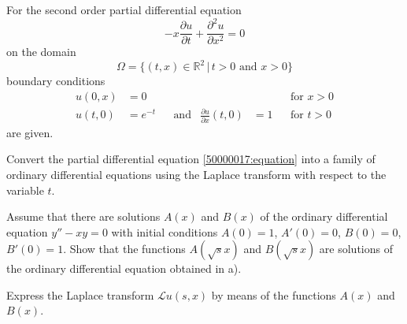 For the second order partial differential equation
\begin{equation}
-x\frac{\partial u}{\partial t}
+
\frac{\partial^2 u}{\partial x^2}
=
0
\label{50000017:equation}
\end{equation}
on the domain
\[
\Omega = \{ (t,x)\in \mathbb R^2 \,|\, \text{$t>0$ and $x>0$}\}
\]
boundary conditions
\[
\begin{aligned}
u(0,x) &= 0
&&&&
&&\text{for $x>0$}
\\
u(t,0) &= e^{-t}
&&\text{and}&
\frac{\partial u}{\partial x}(t,0) &= 1
&&\text{for $t>0$}
\end{aligned}
\]
are given.
\begin{teilaufgaben}
\item
Convert the partial differential equation \eqref{50000017:equation}
into a family of ordinary differential equations using the
Laplace transform with respect to the variable $t$.
\item
Assume that there are solutions $A(x)$ and $B(x)$ of the
ordinary differential equation $y''-xy=0$ with
initial conditions $A(0)=1$, $A'(0)=0$,
$B(0)=0$, $B'(0)=1$.
Show that the functions $A(\sqrt{s}x)$ and $B(\sqrt{s}x)$
are solutions of the ordinary differential equation obtained in a).
\item
Express the Laplace transform $\mathcal{L}u(s,x)$ by means of the functions
$A(x)$ and $B(x)$.
\end{teilaufgaben}


